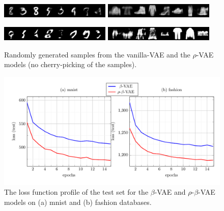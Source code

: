 \documentclass{article}
\begin{document}
 \begin{figure}  [!h]
   \begin{center} 
 {\includegraphics[width=0.47\textwidth]{figs/pics/generation_VanillaVAE_mnist.png}} 
 {\includegraphics[width=0.47\textwidth]{figs/pics/generation_VanillaVAE_fashion.png}} 

 {\includegraphics[width=0.47\textwidth]{figs/pics/generation_RHO_VanillaVAE_mnist.png}} 
 {\includegraphics[width=0.47\textwidth]{figs/pics/generation_RHO_VanillaVAE_fashion.png}} 

\end{center}
\vspace{-0.4cm}    
   \caption{Randomly generated samples from the vanilla-VAE and the $\rho$-VAE models (no cherry-picking of the samples).}
   \label{fig:pic_VanillaVAE}
   \end{figure}



 \begin{figure}  [!h]
   \begin{center} 
\includegraphics[width=1.0\textwidth]{figs/curves/BETA_VAE.pdf}
\end{center}
\vspace{-.75cm}     
   \caption{The loss function profile of the test set for the $\beta$-VAE and $\rho$-$\beta$-VAE models on (a) mnist and (b) fashion databases.}
   \label{fig:curve_BETAVAE}
   \end{figure}
\end{document}

